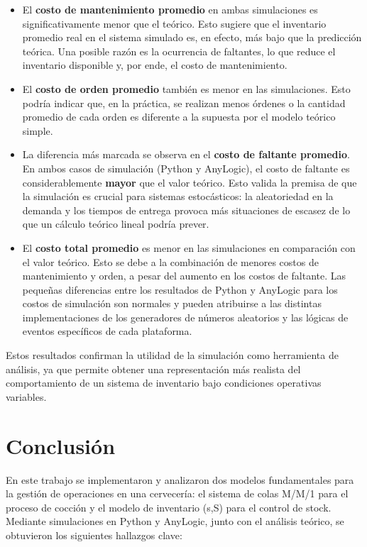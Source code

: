 \documentclass{article}
\begin{document}
\begin{itemize}
    \item El \textbf{costo de mantenimiento promedio} en ambas simulaciones es significativamente menor que el teórico. Esto sugiere que el inventario promedio real en el sistema simulado es, en efecto, más bajo que la predicción teórica. Una posible razón es la ocurrencia de faltantes, lo que reduce el inventario disponible y, por ende, el costo de mantenimiento.
    \item El \textbf{costo de orden promedio} también es menor en las simulaciones. Esto podría indicar que, en la práctica, se realizan menos órdenes o la cantidad promedio de cada orden es diferente a la supuesta por el modelo teórico simple.
    \item La diferencia más marcada se observa en el \textbf{costo de faltante promedio}. En ambos casos de simulación (Python y AnyLogic), el costo de faltante es considerablemente \textbf{mayor} que el valor teórico. Esto valida la premisa de que la simulación es crucial para sistemas estocásticos: la aleatoriedad en la demanda y los tiempos de entrega provoca más situaciones de escasez de lo que un cálculo teórico lineal podría prever.
    \item El \textbf{costo total promedio} es menor en las simulaciones en comparación con el valor teórico. Esto se debe a la combinación de menores costos de mantenimiento y orden, a pesar del aumento en los costos de faltante. Las pequeñas diferencias entre los resultados de Python y AnyLogic para los costos de simulación son normales y pueden atribuirse a las distintas implementaciones de los generadores de números aleatorios y las lógicas de eventos específicos de cada plataforma.
\end{itemize}


Estos resultados confirman la utilidad de la simulación como herramienta de análisis, ya que permite obtener una representación más realista del comportamiento de un sistema de inventario bajo condiciones operativas variables.






\section{Conclusión}


En este trabajo se implementaron y analizaron dos modelos fundamentales para la gestión de operaciones en una cervecería: el sistema de colas M/M/1 para el proceso de cocción y el modelo de inventario (s,S) para el control de stock. Mediante simulaciones en Python y AnyLogic, junto con el análisis teórico, se obtuvieron los siguientes hallazgos clave:
\end{document}

